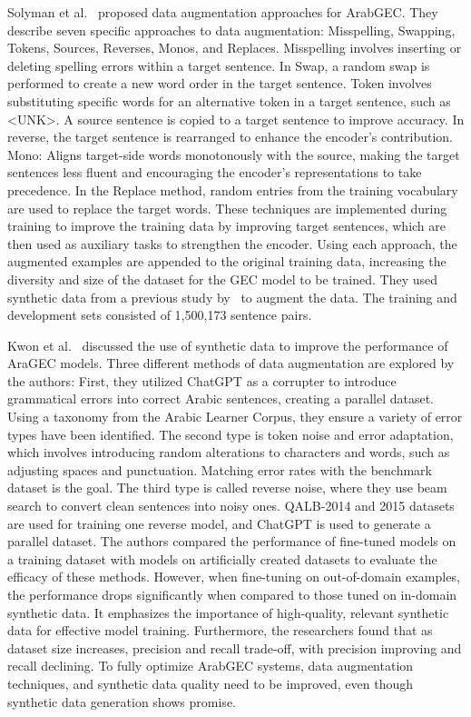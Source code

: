 Solyman et al.~\cite{solyman2023optimizing} proposed data augmentation approaches for ArabGEC. They describe seven specific approaches to data augmentation: Misspelling, Swapping, Tokens, Sources, Reverses, Monos, and Replaces.  Misspelling involves inserting or deleting spelling errors within a target sentence. In Swap, a random swap is performed to create a new word order in the target sentence. Token involves substituting specific words for an alternative token in a target sentence, such as <UNK>. A source sentence is copied to a target sentence to improve accuracy. In reverse, the target sentence is rearranged to enhance the encoder's contribution. Mono: Aligns target-side words monotonously with the source, making the target sentences less fluent and encouraging the encoder's representations to take precedence. In the Replace method, random entries from the training vocabulary are used to replace the target words.  These techniques are implemented during training to improve the training data by improving target sentences, which are then used as auxiliary tasks to strengthen the encoder.  Using each approach, the augmented examples are appended to the original training data, increasing the diversity and size of the dataset for the GEC model to be trained. They used synthetic data from a previous study by~\cite{solyman2022automatic} to augment the data. The training and development sets consisted of 1,500,173 sentence pairs.

Kwon et al.~\cite{kwon2023chatgpt} discussed the use of synthetic data to improve the performance of AraGEC models. Three different methods of data augmentation are explored by the authors: First, they utilized ChatGPT as a corrupter to introduce grammatical errors into correct Arabic sentences, creating a parallel dataset. Using a taxonomy from the Arabic Learner Corpus, they ensure a variety of error types have been identified. The second type is token noise and error adaptation, which involves introducing random alterations to characters and words, such as adjusting spaces and punctuation. Matching error rates with the benchmark dataset is the goal. The third type is called reverse noise, where they use beam search to convert clean sentences into noisy ones. QALB-2014 and 2015 datasets are used for training one reverse model, and ChatGPT is used to generate a parallel dataset. The authors compared the performance of fine-tuned models on a training dataset with models on artificially created datasets to evaluate the efficacy of these methods. However, when fine-tuning on out-of-domain examples, the performance drops significantly when compared to those tuned on in-domain synthetic data. It emphasizes the importance of high-quality, relevant synthetic data for effective model training. Furthermore, the researchers found that as dataset size increases, precision and recall trade-off, with precision improving and recall declining. To fully optimize ArabGEC systems, data augmentation techniques, and synthetic data quality need to be improved, even though synthetic data generation shows promise.


